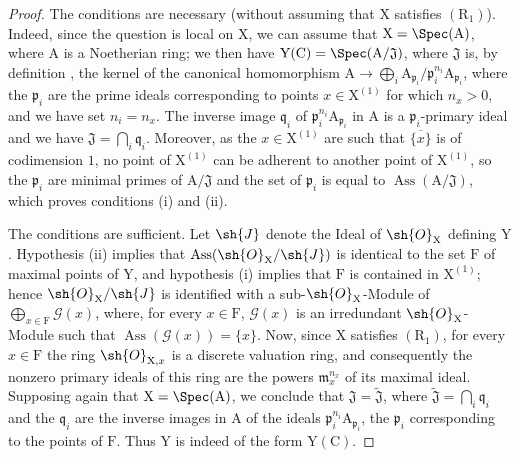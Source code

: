 \begin{proof}
The conditions are necessary (without assuming that $\mathrm{X}$ satisfies $(\mathrm{R}_1)$).
Indeed, since the question is local on $\mathrm{X}$, we can assume that $\mathrm{X}=\Spec(\mathrm{A})$, where $\mathrm{A}$ is a Noetherian ring;
we then have $\mathrm{Y}(\mathrm{C})=\Spec(\mathrm{A}/\mathfrak{J})$, where $\mathfrak{J}$ is, by definition , the kernel of the canonical homomorphism $\mathrm{A}\to\bigoplus_i\mathrm{A}_{\mathfrak{p}_i}/\mathfrak{p}_i^{n_i}\mathrm{A}_{\mathfrak{p}_i}$, where the $\mathfrak{p}_i$ are the prime ideals corresponding to points $x\in\mathrm{X}^{(1)}$ for which $n_x>0$, and we have set $n_i=n_x$.
The inverse image $\mathfrak{q}_i$ of $\mathfrak{p}_i^{n_i}\mathrm{A}_{\mathfrak{p}_i}$ in $\mathrm{A}$ is a $\mathfrak{p}_i$-primary ideal and we have $\mathfrak{J}=\bigcap_i\mathfrak{q}_i$.
Moreover, as the $x\in\mathrm{X}^{(1)}$ are such that $\overline{\{x\}}$ is of codimension $1$, no point of $\mathrm{X}^{(1)}$ can be adherent to another point of $\mathrm{X}^{(1)}$, so the $\mathfrak{p}_i$ are minimal primes of $\mathrm{A}/\mathfrak{J}$ and the set of $\mathfrak{p}_i$ is equal to $\operatorname{Ass}(\mathrm{A}/\mathfrak{J})$, which proves conditions (i) and (ii).

The conditions are sufficient.
Let $\sh{J}$ denote the Ideal of $\sh{O}_\mathrm{X}$ defining $\mathrm{Y}$.
Hypothesis (ii) implies that $\operatorname{Ass}(\sh{O}_\mathrm{X}/\sh{J})$ is identical to the set $\mathrm{F}$ of maximal points of $\mathrm{Y}$, and hypothesis (i) implies that $\mathrm{F}$ is contained in $\mathrm{X}^{(1)}$;
hence  $\sh{O}_\mathrm{X}/\sh{J}$ is identified with a sub-$\sh{O}_\mathrm{X}$-Module of $\bigoplus_{x\in\mathrm{F}}\mathscr{G}(x)$, where, for every $x\in\mathrm{F}$, $\mathscr{G}(x)$ is an irredundant $\sh{O}_\mathrm{X}$-Module such that $\operatorname{Ass}(\mathscr{G}(x))=\{x\}$.
Now, since $\mathrm{X}$ satisfies $(\mathrm{R}_1)$, for every $x\in\mathrm{F}$ the ring $\sh{O}_{\mathrm{X},x}$ is a discrete valuation ring, and consequently the nonzero primary ideals of this ring are the powers $\mathfrak{m}_x^{n_x}$ of its maximal ideal.
Supposing again that $\mathrm{X}=\Spec(\mathrm{A})$, we conclude that $\mathfrak{J}=\widetilde{\mathfrak{J}}$, where $\widetilde{\mathfrak{J}}=\bigcap_i\mathfrak{q}_i$ and the $\mathfrak{q}_i$ are the inverse images in $\mathrm{A}$ of the ideals $\mathfrak{p}_i^{n_i}\mathrm{A}_{\mathfrak{p}_i}$, the $\mathfrak{p}_i$ corresponding to the points of $\mathrm{F}$.
Thus $\mathrm{Y}$ is indeed of the form $\mathrm{Y}(\mathrm{C})$.
\end{proof}

